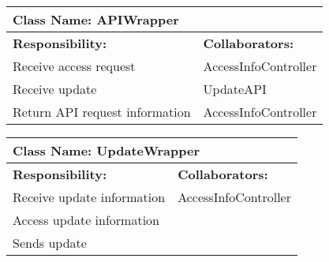 \documentclass[]{article}
\begin{document}
	\begin{table}[ht]
		\centering
		\begin{tabular}{|p{5cm}|p{5cm}|}
			\hline 
			\multicolumn{2}{|l|}{\textbf{Class Name: APIWrapper}} \\
			\hline
			\textbf{Responsibility:} & \textbf{Collaborators:} \\
			\hline
			Receive access request  & AccessInfoController\\
			\hline
			Receive update & UpdateAPI\\
			\hline
			Return API request information & AccessInfoController\\
			\hline
		\end{tabular}
	\end{table}	
	
	\begin{table}[ht]
		\centering
		\begin{tabular}{|p{5cm}|p{5cm}|}
			\hline 
			\multicolumn{2}{|l|}{\textbf{Class Name: UpdateWrapper}} \\
			\hline
			\textbf{Responsibility:} & \textbf{Collaborators:} \\
			\hline
			Receive update information  & AccessInfoController\\
			\hline
			Access update information & \\
			\hline
			Sends update & \\
			\hline
		\end{tabular}
	\end{table}	



\newpage
\clearpage
\appendix
\end{document}
